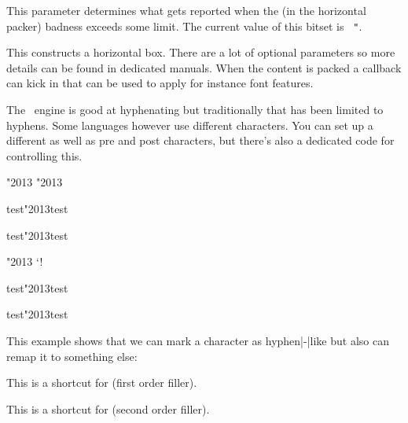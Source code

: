 \stopoldprimitive

\startnewprimitive[title={\prm {hbadnessmode}}]

This parameter determines what gets reported when the (in the horizontal packer)
badness exceeds some limit. The current value of this bitset is {\tt
"\tohexadecimal \hbadnessmode}.

\startfourrows
{}
\stopfourrows

\stopnewprimitive

\startoldprimitive[title={\prm {hbox}}]

This constructs a horizontal box. There are a lot of optional parameters so more
details can be found in dedicated manuals. When the content is packed a callback
can kick in that can be used to apply for instance font features.

\stopoldprimitive

\startnewprimitive[title={\prm {hccode}}]

The \TEX\ engine is good at hyphenating but traditionally that has been limited
to hyphens. Some languages however use different characters. You can set up a
different  as well as pre and post characters, but there's also
a dedicated code for controlling this.

\startbuffer
\hccode"2013 "2013

\hsize 50mm test\char"2013test\par
\hsize  1mm test\char"2013test\par

\hccode"2013 `!

\hsize 50mm test\char"2013test\par
\hsize  1mm test\char"2013test\par
\stopbuffer

\typebuffer

This example shows that we can mark a character as hyphen|-|like but also can
remap it to something else:

\startpacked \getbuffer \stoppacked

\stopnewprimitive

\startoldprimitive[title={\prm {hfil}}]

This is a shortcut for  (first order filler).

\stopoldprimitive

\startoldprimitive[title={\prm {hfill}}]

This is a shortcut for  (second order filler).

